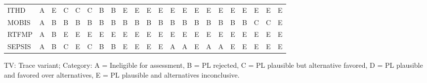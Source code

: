 {\begin{tabular}{lccccccccccccccccccccc}
ITHD & \cellcolor[HTML]{FFFFFF} A & \cellcolor[HTML]{19C8C8} E & \cellcolor[HTML]{9670BD} C & \cellcolor[HTML]{9670BD} C & \cellcolor[HTML]{9670BD} C & \cellcolor[HTML]{EA4646} B & \cellcolor[HTML]{EA4646} B & \cellcolor[HTML]{19C8C8} E & \cellcolor[HTML]{19C8C8} E & \cellcolor[HTML]{19C8C8} E & \cellcolor[HTML]{19C8C8} E & \cellcolor[HTML]{19C8C8} E & \cellcolor[HTML]{19C8C8} E & \cellcolor[HTML]{19C8C8} E & \cellcolor[HTML]{19C8C8} E & \cellcolor[HTML]{19C8C8} E & \cellcolor[HTML]{19C8C8} E & \cellcolor[HTML]{19C8C8} E & \cellcolor[HTML]{19C8C8} E & \cellcolor[HTML]{19C8C8} E & \cellcolor[HTML]{19C8C8} E \\
MOBIS & \cellcolor[HTML]{FFFFFF} A & \cellcolor[HTML]{EA4646} B & \cellcolor[HTML]{EA4646} B & \cellcolor[HTML]{EA4646} B & \cellcolor[HTML]{EA4646} B & \cellcolor[HTML]{EA4646} B & \cellcolor[HTML]{EA4646} B & \cellcolor[HTML]{EA4646} B & \cellcolor[HTML]{EA4646} B & \cellcolor[HTML]{EA4646} B & \cellcolor[HTML]{EA4646} B & \cellcolor[HTML]{EA4646} B & \cellcolor[HTML]{EA4646} B & \cellcolor[HTML]{EA4646} B & \cellcolor[HTML]{EA4646} B & \cellcolor[HTML]{EA4646} B & \cellcolor[HTML]{EA4646} B & \cellcolor[HTML]{EA4646} B & \cellcolor[HTML]{9670BD} C & \cellcolor[HTML]{9670BD} C & \cellcolor[HTML]{19C8C8} E \\
RTFMP & \cellcolor[HTML]{FFFFFF} A & \cellcolor[HTML]{EA4646} B & \cellcolor[HTML]{19C8C8} E & \cellcolor[HTML]{19C8C8} E & \cellcolor[HTML]{19C8C8} E & \cellcolor[HTML]{19C8C8} E & \cellcolor[HTML]{19C8C8} E & \cellcolor[HTML]{19C8C8} E & \cellcolor[HTML]{19C8C8} E & \cellcolor[HTML]{19C8C8} E & \cellcolor[HTML]{19C8C8} E & \cellcolor[HTML]{19C8C8} E & \cellcolor[HTML]{19C8C8} E & \cellcolor[HTML]{19C8C8} E & \cellcolor[HTML]{19C8C8} E & \cellcolor[HTML]{19C8C8} E & \cellcolor[HTML]{19C8C8} E & \cellcolor[HTML]{19C8C8} E & \cellcolor[HTML]{19C8C8} E & \cellcolor[HTML]{19C8C8} E & \cellcolor[HTML]{19C8C8} E \\
SEPSIS & \cellcolor[HTML]{FFFFFF} A & \cellcolor[HTML]{EA4646} B & \cellcolor[HTML]{9670BD} C & \cellcolor[HTML]{19C8C8} E & \cellcolor[HTML]{9670BD} C & \cellcolor[HTML]{EA4646} B & \cellcolor[HTML]{EA4646} B & \cellcolor[HTML]{19C8C8} E & \cellcolor[HTML]{19C8C8} E & \cellcolor[HTML]{19C8C8} E & \cellcolor[HTML]{19C8C8} E & \cellcolor[HTML]{FFFFFF} A & \cellcolor[HTML]{FFFFFF} A & \cellcolor[HTML]{19C8C8} E & \cellcolor[HTML]{FFFFFF} A & \cellcolor[HTML]{FFFFFF} A & \cellcolor[HTML]{19C8C8} E & \cellcolor[HTML]{19C8C8} E & \cellcolor[HTML]{19C8C8} E & \cellcolor[HTML]{19C8C8} E & \cellcolor[HTML]{19C8C8} E \\
\bottomrule
\end{tabular}
}
\begin{center}\footnotesize
TV: Trace variant; \quad Category: A = Ineligible for assessment, B = PL rejected, C = PL plausible but alternative favored, D = PL plausible and favored over alternatives, E = PL plausible and alternatives inconclusive.
\end{center}
